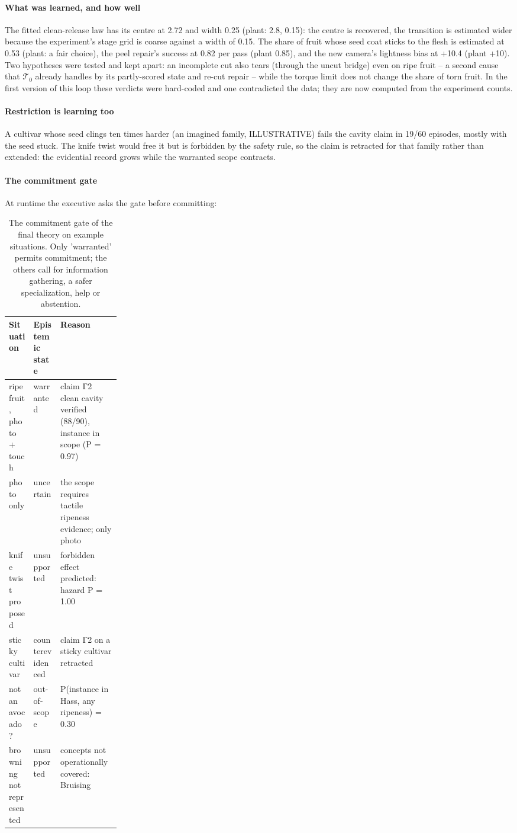 \documentclass[10.5pt,a4paper]{article}
\begin{document}
\paragraph{What was learned, and how well} The fitted clean-release law has its centre at 2.72 and width 0.25 (plant: 2.8, 0.15): the centre is recovered, the transition is estimated wider because the experiment's stage grid is coarse
against a width of 0.15. The share of fruit whose seed coat sticks to the flesh is estimated at 0.53 (plant: a fair choice), the peel repair's success at 0.82 per pass (plant 0.85), and the new camera's lightness bias at +10.4 (plant +10). Two hypotheses were tested and kept apart: an incomplete cut also tears
(through the uncut bridge) even on ripe fruit -- a second cause that $\mathcal{T}_0$ already handles by its
partly-scored state and re-cut repair -- while the torque limit does not change the share of torn fruit. In the first
version of this loop these verdicts were hard-coded and one contradicted the data; they are now computed from the
experiment counts.

\paragraph{Restriction is learning too} A cultivar whose seed clings ten times harder (an imagined family,
ILLUSTRATIVE) fails the cavity claim in 19/60 episodes, mostly with the seed stuck. The knife twist would free it but is forbidden by the safety rule, so
the claim is retracted for that family rather than extended: the evidential record grows while the warranted scope
contracts.

\paragraph{The commitment gate} At runtime the executive asks the gate before committing:
\begin{table}[htbp]\centering\scriptsize\caption{The commitment gate of the final theory on example situations. Only 'warranted' permits commitment; the others call for information gathering, a safer specialization, help or abstention.}
\begin{tabularx}{\linewidth}{@{}p{0.22\linewidth}lX@{}}\toprule Situation & Epistemic state & Reason \\\midrule
ripe fruit, photo + touch & warranted & claim Γ2 clean cavity verified (88/90), instance in scope (P = 0.97) \\
photo only & uncertain & the scope requires tactile ripeness evidence; only photo \\
knife twist proposed & unsupported & forbidden effect predicted: hazard P = 1.00 \\
sticky cultivar & counterevidenced & claim Γ2 on a sticky cultivar retracted \\
not an avocado? & out-of-scope & P(instance in Hass, any ripeness) = 0.30 \\
browning not represented & unsupported & concepts not operationally covered: Bruising \\\bottomrule\end{tabularx}\end{table}
\end{document}
